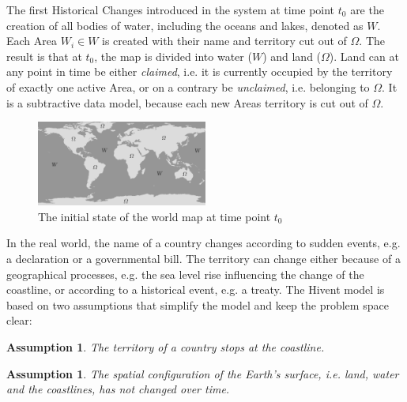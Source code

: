 The first Historical Changes introduced in the system at time point $t_0$ are the creation of all bodies of water, including the oceans and lakes, denoted as $W$. Each Area $W_i \in W$ is created with their name and territory cut out of $\Omega$. The result is that at $t_0$, the map is divided into water ($W$) and land ($\Omega$). Land can at any point in time be either \emph{claimed}, i.e. it is currently occupied by the territory of exactly one active Area, or on a contrary be \emph{unclaimed}, i.e. belonging to $\Omega$. It is a subtractive data model, because each new Areas territory is cut out of $\Omega$.

\begin{figure}[H]
  \centering
  \includegraphics[width=0.5\textwidth]{graphics/development/init_map}
  \caption{The initial state of the world map at time point $t_0$}
  \label{fig:init_map}
\end{figure}

In the real world, the name of a country changes according to sudden events, e.g. a declaration or a governmental bill. The territory can change either because of a geographical processes, e.g. the sea level rise influencing the change of the coastline, or according to a historical event, e.g. a treaty. The Hivent model is based on two assumptions that simplify the model and keep the problem space clear:

\vspace{-1.0em}
\newtheorem{coastline_territory}[assicounter]{Assumption}
\begin{coastline_territory}
\label{axm:coastline_territory}
  The territory of a country stops at the coastline.
\end{coastline_territory}

\vspace{-1.5em}
\newtheorem{constant_coastlines}[assicounter]{Assumption}
\begin{constant_coastlines}
\label{axm:constant_coastlines}
  The spatial configuration of the Earth's surface, i.e. land, water and the coastlines, has not changed over time.
\end{constant_coastlines}

